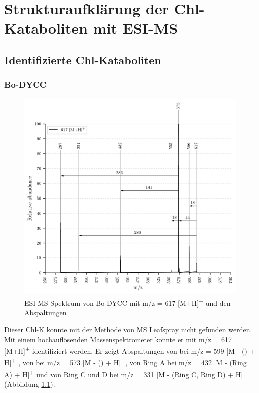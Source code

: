 \chapter{Strukturaufklärung der Chl-Kataboliten mit ESI-MS}

\section{Identifizierte Chl-Kataboliten}

\subsection{Bo-DYCC}

\begin{figure}[!htbp]
  \centering
  \includegraphics[width=\textwidth, height=0.7\textwidth]{figures/Kapitel7/Kataboliten/VWA_MS_617.png}
  \caption[ESI-MS Spektrum von Bo-DYCC, Quelle: Autor]{ESI-MS Spektrum von Bo-DYCC mit m/z = 617 [M+H]\textsuperscript{+} und den Abspaltungen}
  \label{fig:617MH}
\end{figure}

Dieser \gls{Chl-K} konnte mit der Methode von MS Leafspray nicht gefunden werden. Mit einem hochauflösenden Massenspektrometer konnte er mit m/z = 617 [M+H]\textsuperscript{+} identifiziert werden. Er zeigt Abspaltungen von  bei m/z = 599 [M - () + H]\textsuperscript{+} , von  bei m/z = 573 [M - () + H]\textsuperscript{+}, von Ring A bei m/z = 432 [M - (Ring A) + H]\textsuperscript{+} und von Ring C und D bei m/z = 331 [M - (Ring C, Ring D) + H]\textsuperscript{+} (Abbildung \ref{fig:617MH}).

